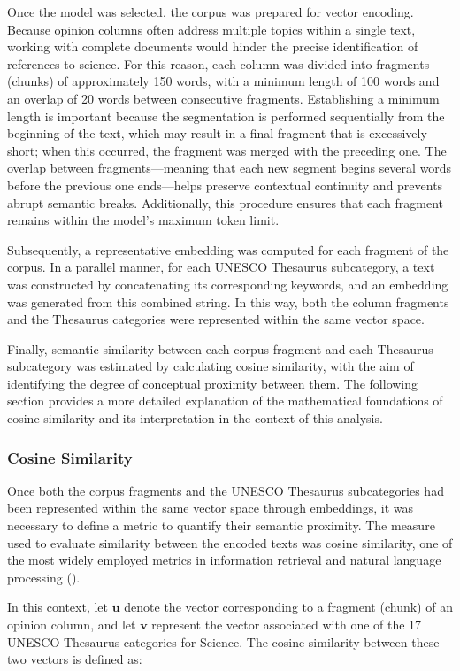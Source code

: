 \documentclass[11pt,a4paper]{article}
\begin{document}
Once the model was selected, the corpus was prepared for vector encoding. Because opinion columns often address multiple topics within a single text, working with complete documents would hinder the precise identification of references to science. For this reason, each column was divided into fragments (chunks) of approximately 150 words, with a minimum length of 100 words and an overlap of 20 words between consecutive fragments. Establishing a minimum length is important because the segmentation is performed sequentially from the beginning of the text, which may result in a final fragment that is excessively short; when this occurred, the fragment was merged with the preceding one. The overlap between fragments—meaning that each new segment begins several words before the previous one ends—helps preserve contextual continuity and prevents abrupt semantic breaks. Additionally, this procedure ensures that each fragment remains within the model’s maximum token limit.

Subsequently, a representative embedding was computed for each fragment of the corpus. In a parallel manner, for each UNESCO Thesaurus subcategory, a text was constructed by concatenating its corresponding keywords, and an embedding was generated from this combined string. In this way, both the column fragments and the Thesaurus categories were represented within the same vector space.

Finally, semantic similarity between each corpus fragment and each Thesaurus subcategory was estimated by calculating cosine similarity, with the aim of identifying the degree of conceptual proximity between them. The following section provides a more detailed explanation of the mathematical foundations of cosine similarity and its interpretation in the context of this analysis.

	
	\subsubsection{Cosine Similarity}
	
	Once both the corpus fragments and the UNESCO Thesaurus subcategories had been represented within the same vector space through embeddings, it was necessary to define a metric to quantify their semantic proximity. The measure used to evaluate similarity between the encoded texts was cosine similarity, one of the most widely employed metrics in information retrieval and natural language processing (\cite{jurafsky2025}).
	
	In this context, let $\mathbf{u}$ denote the vector corresponding to a fragment (chunk) of an opinion column, and let $\mathbf{v}$ represent the vector associated with one of the 17 UNESCO Thesaurus categories for Science. The cosine similarity between these two vectors is defined as:
		
\end{document}
